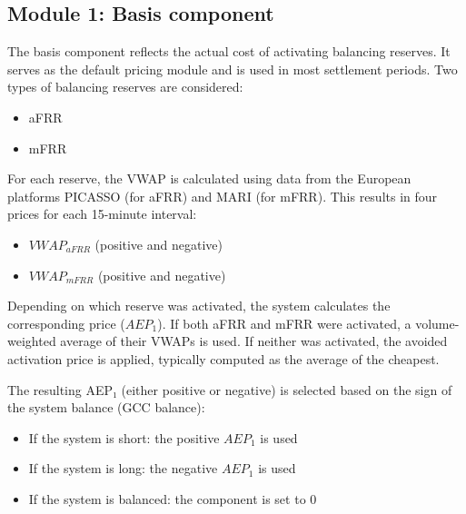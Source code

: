 \documentclass[class=scrbook, crop=false]{standalone}
\begin{document}
\subsection{Module 1: Basis component}
The basis component reflects the actual cost of activating balancing reserves. It serves as the default pricing module and is used in most settlement periods.
Two types of balancing reserves are considered:
\begin{itemize}
\item \gls{aFRR} 
\item \gls{mFRR} 
\end{itemize}

For each reserve, the \gls{VWAP} is calculated using data from the European platforms PICASSO (for \gls{aFRR}) and MARI (for \gls{mFRR}).
This results in four prices for each 15-minute interval:
\begin{itemize}
\item $VWAP_{aFRR}$ (positive and negative)
\item $VWAP_{mFRR}$ (positive and negative)
\end{itemize}

Depending on which reserve was activated, the system calculates the corresponding price ($AEP_1$). If both \gls{aFRR} and \gls{mFRR} were activated, a volume-weighted average of their \gls{VWAP}s is used.
If neither was activated, the avoided activation price is applied, typically computed as the average of the cheapest.

The resulting AEP₁ (either positive or negative) is selected based on the sign of the system balance (GCC balance)\cite{NetztransparenzReBAP}:
\begin{itemize}
\item If the system is short: the positive $AEP_1$ is used
\item If the system is long: the negative $AEP_1$ is used
\item If the system is balanced: the component is set to 0
\end{itemize}




\end{document}
